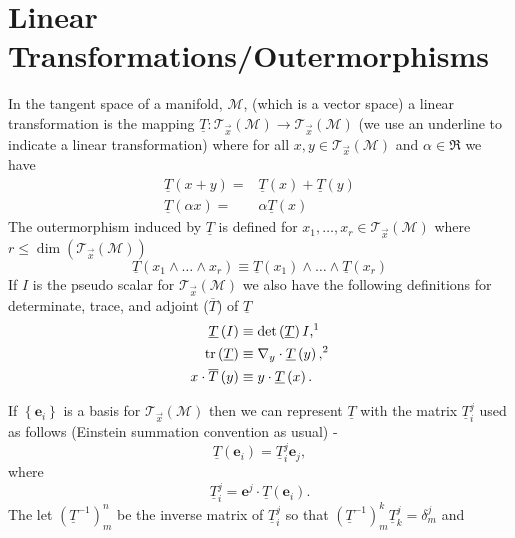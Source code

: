 \documentclass[12pt]{report}
\newcommand{\bm}[1]{\boldsymbol{#1}}
\newcommand{\lp}{\left (}
\newcommand{\rp}{\right )}
\newcommand{\lbrc}{\left \{}
\newcommand{\rbrc}{\right \}}
\newcommand{\set}[1]{\lbrc {#1} \rbrc}
\newcommand{\W}{\wedge}
\newcommand{\f}[2]{{#1}\lp {#2} \rp}
\newcommand{\paren}[1]{\lp {#1} \rp}
\newcommand{\be}{\begin{equation}}
\newcommand{\ee}{\end{equation}}
\newcommand{\eb}{\bm{e}}
\newcommand{\Tn}[2]{\f{\mathcal{T}_{#2}}{#1}}
\newcommand{\tr}{\mbox{tr}}
\begin{document}
\section{Linear Transformations/Outermorphisms}\label{Ltrans}

In the tangent space of a manifold, $\mathcal{M}$, (which is a vector space) a linear transformation is the mapping
$\underline{T}\colon\Tn{\mathcal{M}}{\vec{x}}\rightarrow\Tn{\mathcal{M}}{\vec{x}}$ (we use an underline to indicate
a linear transformation) where for all $x,y\in \Tn{\mathcal{M}}{\vec{x}}$ and $\alpha\in\Re$ we have
\begin{align}
    \f{\underline{T}}{x+y} =& \f{\underline{T}}{x} + \f{\underline{T}}{y} \\
    \f{\underline{T}}{\alpha x} =& \alpha\f{\underline{T}}{x}
\end{align}
The outermorphism induced by $\underline{T}$ is defined for $x_{1},\dots,x_{r}\in\Tn{\mathcal{M}}{\vec{x}}$ where
$r\le\f{\dim}{\Tn{\mathcal{M}}{\vec{x}}}$
\be
    \f{\underline{T}}{x_{1}\W\dots\W x_{r}} \equiv \f{\underline{T}}{x_{1}}\W\dots\W\f{\underline{T}}{x_{r}}
\ee
If $I$ is the pseudo scalar for $\Tn{\mathcal{M}}{\vec{x}}$ we also have the following definitions for determinate, trace,
and adjoint ($\overline{T}$) of $\underline{T}$
\begin{align}
    \f{\underline{T}}{I} \equiv&\; \f{\det}{\underline{T}}I\text{,\footnotemark} \label{eq_82}\\
    \f{\tr}{\underline{T}} \equiv&\; \nabla_{y}\cdot\f{\underline{T}}{y}\text{,\footnotemark} \label{eq_83}\\ \addtocounter{footnote}{-1}
    x\cdot \f{\overline{T}}{y} \equiv&\; y\cdot \f{\underline{T}}{x}.\label{eq_84}
\end{align}
\addtocounter{footnote}{1}
If $\set{\eb_{i}}$ is a basis for $\Tn{\mathcal{M}}{\vec{x}}$ then we can represent $\underline{T}$ with the matrix $\underline{T}_{i}^{j}$ used
as follows (Einstein summation convention as usual) -
\be\label{eq_85}
    \f{\underline{T}}{\eb_{i}} = \underline{T}_{i}^{j}\eb_{j},
\ee
where
\be\label{eq_85a}
    \underline{T}_{i}^{j} = \eb^{j}\cdot\f{\underline{T}}{\eb_{i}}.
\ee
The let $\paren{\underline{T}^{-1}}_{m}^{n}$ be the inverse matrix of $\underline{T}_{i}^{j}$ so that 
$\paren{\underline{T}^{-1}}_{m}^{k}\underline{T}_{k}^{j} = \delta^{j}_{m}$ and 
\end{document}
